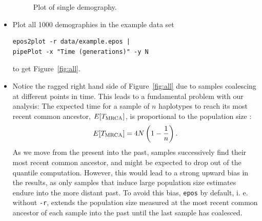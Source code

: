 \documentclass[a4paper]{article}
\newcommand{\ty}{\texttt}
\begin{document}
\begin{itemize}
\begin{figure}
\begin{center}
\end{center}
\caption{Plot of single demography.}\label{fig:sin}
\end{figure}

\item Plot all 1000 demographies in the example data set
\begin{verbatim}
epos2plot -r data/example.epos |
pipePlot -x "Time (generations)" -y N
\end{verbatim}
to get Figure~\ref{fig:all}.

\item Notice the ragged right hand side of Figure~\ref{fig:all} due to
  samples coalescing at different points in time. This leads to a
  fundamental problem with our analysis: The expected time for a
  sample of $n$ haplotypes to reach its most recent common ancestor,
  $E[T_{\rm MRCA}]$,  is
  proportional to the population size \cite[p. 76]{wak09:coa}:
\[
E[T_{\rm MRCA}]=4N\left(1-\frac{1}{n}\right).
\]
As we move from the present into the past, samples successively find
their most recent common ancestor, and might be expected to drop out
of the quantile computation. However, this would lead to a strong
upward bias in the results, as only samples that induce large
population size estimates endure into the more distant past. To avoid this
bias, \ty{epos} by default, i. e. without \ty{-r}, extends the
population size measured at the most recent common ancestor of each
sample into the past until the last sample has coalesced.



\end{itemize}
\end{document}
